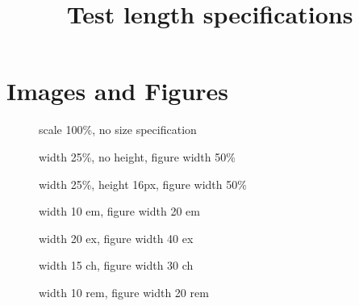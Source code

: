 \documentclass[a4paper,landscape]{article}
\newlength{\DUchdimen}
\begin{document}
\title{Test length specifications%
  \label{test-length-specifications}}
\author{}
\date{}
\maketitle


\section{Images and Figures%
  \label{images-and-figures}%
}

\begin{figure}
\noindent{}
\caption{scale 100\%, no size specification}
\end{figure}

\begin{figure}
\noindent{}
\caption{width 25\%, no height, figure width 50\%}
\end{figure}

\begin{figure}
\noindent{}
\caption{width 25\%, height 16px, figure width 50\%}
\end{figure}

\begin{figure}
\noindent{}
\caption{width 10 em, figure width 20 em}
\end{figure}

\begin{figure}
\noindent{}
\caption{width 20 ex, figure width 40 ex}
\end{figure}

\begin{figure}
\noindent{}
\caption{width 15 ch, figure width 30 ch}
\end{figure}

\begin{figure}
\noindent{}
\caption{width 10 rem, figure width 20 rem}
\end{figure}
\end{document}

